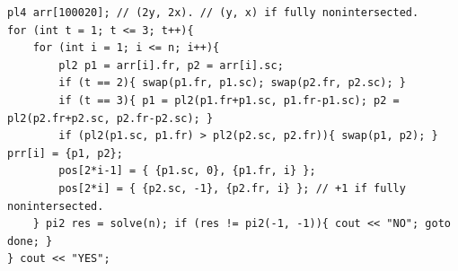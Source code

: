 \begin{verbatim}
pl4 arr[100020]; // (2y, 2x). // (y, x) if fully nonintersected.
for (int t = 1; t <= 3; t++){
	for (int i = 1; i <= n; i++){
		pl2 p1 = arr[i].fr, p2 = arr[i].sc;
		if (t == 2){ swap(p1.fr, p1.sc); swap(p2.fr, p2.sc); }
		if (t == 3){ p1 = pl2(p1.fr+p1.sc, p1.fr-p1.sc); p2 = pl2(p2.fr+p2.sc, p2.fr-p2.sc); }
		if (pl2(p1.sc, p1.fr) > pl2(p2.sc, p2.fr)){ swap(p1, p2); } prr[i] = {p1, p2};
		pos[2*i-1] = { {p1.sc, 0}, {p1.fr, i} };
		pos[2*i] = { {p2.sc, -1}, {p2.fr, i} }; // +1 if fully nonintersected.
	} pi2 res = solve(n); if (res != pi2(-1, -1)){ cout << "NO"; goto done; }
} cout << "YES";
\end{verbatim}